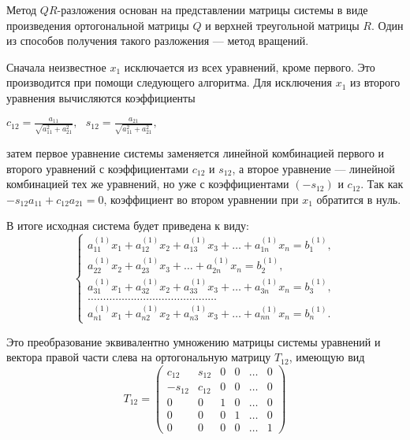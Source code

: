 \documentclass[12pt, a4paper]{article}
\begin{document}
    Метод $QR$-разложения основан на представлении матрицы системы в виде произведения ортогональной матрицы $Q$ и верхней треугольной матрицы $R$. Один из способов получения такого разложения --- метод вращений. 
    
    Сначала неизвестное $x_1$ исключается из всех уравнений, кроме первого. Это производится при помощи следующего алгоритма. Для исключения $x_1$ из второго уравнения вычисляются коэффициенты
    
    \begin{center}
    $c_{12}=\frac{a_{11}}{\sqrt{a_{11}^{2}+a_{21}^{2}}}, ~ ~ ~
    s_{12}=\frac{a_{21}}{\sqrt{a_{11}^{2}+a_{21}^{2}}},$
    \end{center}
    затем первое уравнение системы заменяется линейной комбинацией первого и второго уравнений с коэффициентами $c_{12}$ и $s_{12}$, а второе уравнение --- линейной комбинацией тех же уравнений, но уже с коэффициентами $(-s_{12})$ и $c_{12}$. Так как $-s_{12}a_{11} + c_{12}a_{21}=0$, коэффициент во втором уравнении при $x_1$ обратится в нуль. 
     
    В итоге исходная система будет приведена к виду: 
    \begin{equation*}
        \begin{cases}
        a_{11}^{(1)}x_{1} + a_{12}^{(1)}x_{2}+ a_{13}^{(1)}x_{3}+ \ldots + a_{1n}^{(1)}x_{n} = b_{1}^{(1)},\\
            a_{22}^{(1)}x_{2}+ a_{23}^{(1)}x_{3}+ \ldots + a_{2n}^{(1)}x_{n} = b_{2}^{(1)},\\
            a_{31}^{(1)}x_{1} + a_{32}^{(1)}x_{2}+ a_{33}^{(1)}x_{3}+ \ldots + a_{3n}^{(1)}x_{n} = b_{3}^{(1)},\\
            \ldots\ldots\ldots\ldots\ldots\ldots\ldots\ldots\ldots\ldots\ldots\ldots\ldots\ldots \\
                a_{n1}^{(1)}x_{1} + a_{n2}^{(1)}x_{2}+ a_{n3}^{(1)}x_{3}+ \ldots + a_{nn}^{(1)}x_{n} = b_{n}^{(1)}.
        \end{cases}
    \end{equation*}

Это преобразование эквивалентно умножению матрицы системы уравнений и вектора правой части слева на ортогональную матрицу $T_{12}$, имеющую вид \\ 
\[
T_{12}=
\begin{pmatrix}
c_{12} & s_{12} & 0 & 0 & \ldots & 0 \\
-s_{12} & c_{12} & 0 & 0 & \ldots & 0 \\
0 & 0 & 1 & 0 & \ldots & 0 \\
0 & 0 & 0 & 1 & \ldots & 0 \\
0 & 0 & 0 & 0 & \ldots & 1
\end{pmatrix}
\]
\end{document}
